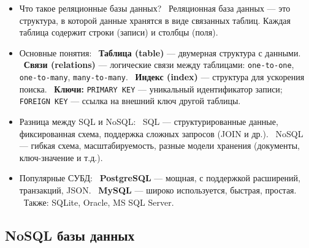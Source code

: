 \documentclass[a4paper,14pt]{article}
\begin{document}
\begin{itemize}
\item Что такое реляционные базы данных? \
Реляционная база данных — это структура, в которой данные хранятся в виде связанных таблиц. Каждая таблица содержит строки (записи) и столбцы (поля).

\item Основные понятия: \
\textbf{Таблица (table)} — двумерная структура с данными. \
\textbf{Связи (relations)} — логические связи между таблицами: \texttt{one-to-one}, \texttt{one-to-many}, \texttt{many-to-many}. \
\textbf{Индекс (index)} — структура для ускорения поиска. \
\textbf{Ключи:} \texttt{PRIMARY KEY} — уникальный идентификатор записи; \texttt{FOREIGN KEY} — ссылка на внешний ключ другой таблицы.

\item Разница между SQL и NoSQL: \
SQL — структурированные данные, фиксированная схема, поддержка сложных запросов (JOIN и др.). \
NoSQL — гибкая схема, масштабируемость, разные модели хранения (документы, ключ-значение и т.д.).

\item Популярные СУБД: \
\textbf{PostgreSQL} — мощная, с поддержкой расширений, транзакций, JSON. \
\textbf{MySQL} — широко используется, быстрая, простая. \
Также: SQLite, Oracle, MS SQL Server.
\end{itemize}

\subsection{NoSQL базы данных}
\end{document}
